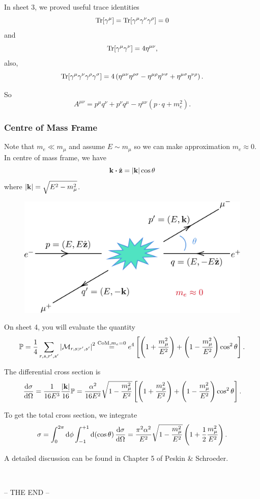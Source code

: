 \documentclass[a4paper,11pt]{article}
\begin{document}
	In sheet 3, we proved useful trace identities
	\[
		\Tr[\gamma^\mu] = \Tr[\gamma^\mu \gamma^\nu \gamma^\rho] = 0
	\]
	and 
	\[
		\Tr[\gamma^\mu \gamma^\nu] = 4 \eta ^{\mu \nu},
	\]
	also,
	\[
		\Tr[\gamma^\mu \gamma^\nu \gamma^\rho \gamma^\sigma] = 4\left( \eta ^{\mu \nu} \eta ^{\rho \sigma} - \eta ^{\mu \rho} \eta ^{\nu \sigma} + \eta ^{\mu \sigma} \eta ^{\nu \rho} \right).
	\]
	
	So 
	\[
		A ^{\mu \nu} = p^\mu q^\nu + p^\nu q^\mu - \eta ^{\mu \nu} (p \cdot q + m_e^2).
	\]
	
	\subsubsection{Centre of Mass Frame}

	Note that $m_e \ll m_\mu$ and assume $E \sim m_\mu$ so we can make approximation $m_e \approx 0$. In centre of mass frame, we have
	\[
		\vb k \vdot \hat{\vb z} = \abs{\vb k}\cos \theta
	\]
	where $\abs{\vb k}=\sqrt{E^2 - m_\mu^2}$.
	
	\begin{figure}[h]
		\centering
		\includegraphics[width=0.6\linewidth]{fig/com-collision.pdf}
	\end{figure}
	
	On sheet 4, you will evaluate the quantity
	\[
		\mathbb{P} = \frac{1}{4} \sum _{r,s,r',s'} \abs{\mathcal{M}_{r,s;r',s'}}^2 \overset{\text{CoM,} m_e = 0}{=} e^4 \left[ \left( 1 + \frac{m_\mu^2}{E^2} \right) + \left( 1 - \frac{m_\mu^2}{E^2} \right) \cos^2\theta \right].
	\]

	The differential cross section is
	\[
		\dv{\sigma}{\Omega} = \frac{1}{16 E^3} \frac{\abs{\vb k}}{16} \mathbb{P} = \frac{\alpha^2}{16E^2} \sqrt{1 - \frac{m_\mu^2}{E^2}}\left[ \left( 1 + \frac{m_\mu^2}{E^2} \right) + \left( 1 - \frac{m_\mu^2}{E^2} \right) \cos^2\theta \right].
	\]
	
	To get the total cross section, we integrate 
	\[
		\sigma = \int_{0}^{2 \pi} \dd{\phi} \int_{-1}^{+1} \dd{(\cos \theta)} \dv{\sigma}{\Omega} = \frac{\pi^2 \alpha^2}{E^2} \sqrt{1 - \frac{m_\mu^2}{E^2}} \left( 1 + \frac{1}{2} \frac{m_\mu^2}{E^2} \right).
	\]
	
	A detailed discussion can be found in Chapter 5 of Peskin \& Schroeder.

	\ 

	\begin{center}
		-- THE END --
	\end{center}
	
\end{document}
